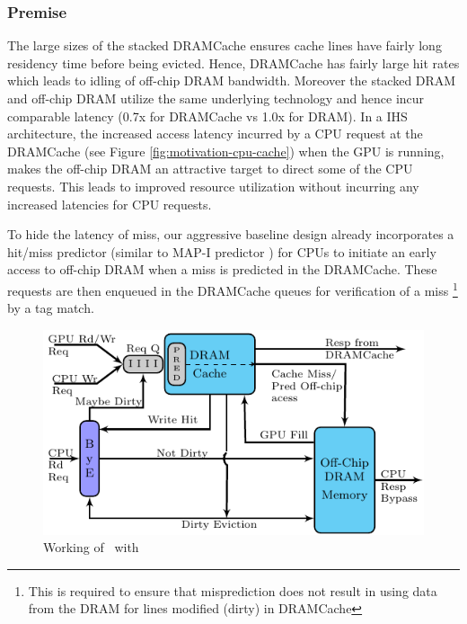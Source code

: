 \subsubsection{Premise}
The large sizes of the stacked DRAMCache ensures cache lines have fairly long residency time before being evicted. Hence, DRAMCache has fairly large hit rates which leads to idling of off-chip DRAM bandwidth. Moreover the stacked DRAM and off-chip DRAM utilize the same underlying technology and hence incur comparable latency (0.7x for DRAMCache vs 1.0x for DRAM). 
In a IHS architecture, the increased access latency incurred by a CPU request at the DRAMCache (see Figure \ref{fig:motivation-cpu-cache}) when the GPU is running, makes the off-chip DRAM an attractive target to direct some of the CPU requests. This leads to improved resource utilization without incurring any increased latencies for CPU requests. 
\par To hide the latency of miss, our aggressive baseline design already incorporates a hit/miss predictor (similar to MAP-I predictor \cite{alloy}) for CPUs to initiate an early access to off-chip DRAM when a miss is predicted in the DRAMCache. These requests are then enqueued in the DRAMCache queues for verification of a miss 
\footnote{This is required to ensure that misprediction does not result in using data from the DRAM for lines modified (dirty) in DRAMCache}
by a tag match. 

\begin{figure}[htb]
	\centering
   	\includegraphics[scale=1.5]{figures/bloom}	
	\caption{Working of \cachename\ with \bypassname}
	\label{fig:bye}
\end{figure}

